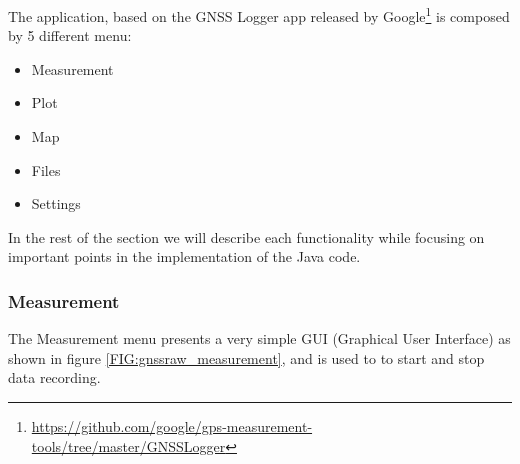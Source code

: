 The application, based on the GNSS Logger app released by Google\footnote{\url{https://github.com/google/gps-measurement-tools/tree/master/GNSSLogger}} is composed by 5 different menu:
\begin{itemize}
\item Measurement
\item Plot
\item Map
\item Files
\item Settings
\end{itemize}
In the rest of the section we will describe each functionality while focusing on important points in 
the implementation of the Java code.
%
\subsubsection*{Measurement}
The Measurement menu presents a very simple GUI (Graphical User Interface) as shown in figure \ref{FIG:gnssraw_measurement}, and is used to to start and stop data recording.
